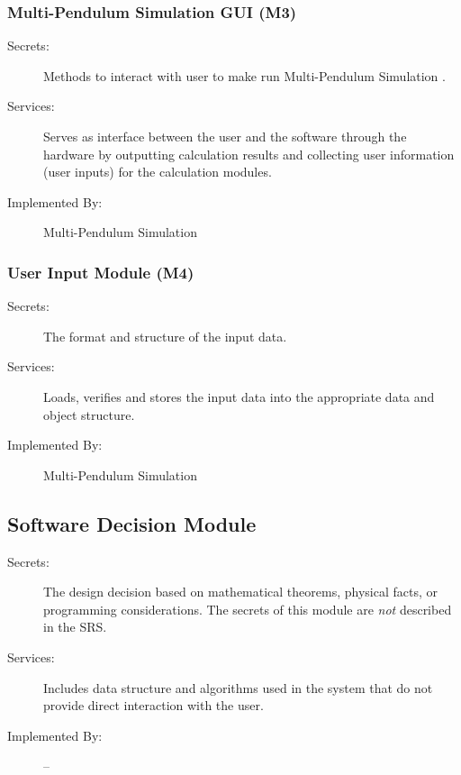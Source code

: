 \documentclass[12pt, titlepage]{article}
\newcommand{\progname}{Multi-Pendulum Simulation }
\begin{document}
\subsubsection{\progname{}GUI (M3)}
\label{MG_GUI}
\begin{description}
\item[Secrets:] Methods to interact with user to make run \progname{}. 
\item[Services:] Serves as interface between the user and the software through 
the hardware by outputting calculation results and collecting user information 
(user inputs) for the calculation modules. 
\item[Implemented By:] \progname{}
\end{description}

\subsubsection{User Input Module (M4)}
\label{MG_InputFormat}
\begin{description}
\item[Secrets:] The format and structure of the input data.
\item[Services:] Loads, verifies and stores the input data into the appropriate 
data and object structure.
\item[Implemented By:] \progname{}
\end{description}

\subsection{Software Decision Module}

\begin{description}
\item[Secrets:] The design decision based on mathematical theorems, physical
  facts, or programming considerations. The secrets of this module are
  \emph{not} described in the SRS.
\item[Services:] Includes data structure and algorithms used in the system that
  do not provide direct interaction with the user. 
\item[Implemented By:] --
\end{description}
\end{document}

